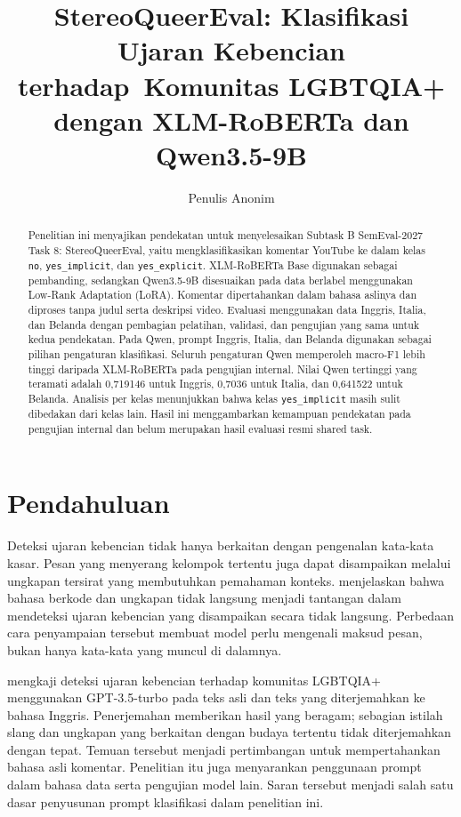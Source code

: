 \documentclass[11pt]{article}
\title{StereoQueerEval: Klasifikasi Ujaran Kebencian terhadap\
Komunitas LGBTQIA+ dengan XLM-RoBERTa dan Qwen3.5-9B}
\author{Penulis Anonim}
\begin{document}
\nolinenumbers
\raggedbottom
\maketitle
\begin{abstract}
Penelitian ini menyajikan pendekatan untuk menyelesaikan Subtask B SemEval-2027 Task 8: StereoQueerEval, yaitu mengklasifikasikan komentar YouTube ke dalam kelas \texttt{no}, \texttt{yes\_implicit}, dan \texttt{yes\_explicit}. XLM-RoBERTa Base digunakan sebagai pembanding, sedangkan Qwen3.5-9B disesuaikan pada data berlabel menggunakan Low-Rank Adaptation (LoRA). Komentar dipertahankan dalam bahasa aslinya dan diproses tanpa judul serta deskripsi video. Evaluasi menggunakan data Inggris, Italia, dan Belanda dengan pembagian pelatihan, validasi, dan pengujian yang sama untuk kedua pendekatan. Pada Qwen, prompt Inggris, Italia, dan Belanda digunakan sebagai pilihan pengaturan klasifikasi. Seluruh pengaturan Qwen memperoleh macro-F1 lebih tinggi daripada XLM-RoBERTa pada pengujian internal. Nilai Qwen tertinggi yang teramati adalah 0,719146 untuk Inggris, 0,7036 untuk Italia, dan 0,641522 untuk Belanda. Analisis per kelas menunjukkan bahwa kelas \texttt{yes\_implicit} masih sulit dibedakan dari kelas lain. Hasil ini menggambarkan kemampuan pendekatan pada pengujian internal dan belum merupakan hasil evaluasi resmi shared task.
\end{abstract}

\section{Pendahuluan}
\label{sec:pendahuluan}
Deteksi ujaran kebencian tidak hanya berkaitan dengan pengenalan kata-kata kasar. Pesan yang menyerang kelompok tertentu juga dapat disampaikan melalui ungkapan tersirat yang membutuhkan pemahaman konteks. \citet{elsherief-etal-2021-latent} menjelaskan bahwa bahasa berkode dan ungkapan tidak langsung menjadi tantangan dalam mendeteksi ujaran kebencian yang disampaikan secara tidak langsung. Perbedaan cara penyampaian tersebut membuat model perlu mengenali maksud pesan, bukan hanya kata-kata yang muncul di dalamnya.

\citet{chan-etal-2024-hate} mengkaji deteksi ujaran kebencian terhadap komunitas LGBTQIA+ menggunakan GPT-3.5-turbo pada teks asli dan teks yang diterjemahkan ke bahasa Inggris. Penerjemahan memberikan hasil yang beragam; sebagian istilah slang dan ungkapan yang berkaitan dengan budaya tertentu tidak diterjemahkan dengan tepat. Temuan tersebut menjadi pertimbangan untuk mempertahankan bahasa asli komentar. Penelitian itu juga menyarankan penggunaan prompt dalam bahasa data serta pengujian model lain. Saran tersebut menjadi salah satu dasar penyusunan prompt klasifikasi dalam penelitian ini.
\end{document}
